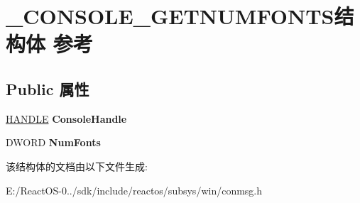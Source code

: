 \hypertarget{struct___c_o_n_s_o_l_e___g_e_t_n_u_m_f_o_n_t_s}{}\section{\+\_\+\+C\+O\+N\+S\+O\+L\+E\+\_\+\+G\+E\+T\+N\+U\+M\+F\+O\+N\+T\+S结构体 参考}
\label{struct___c_o_n_s_o_l_e___g_e_t_n_u_m_f_o_n_t_s}
\subsection*{Public 属性}
\begin{DoxyCompactItemize}
\item 
\mbox{\label{struct___c_o_n_s_o_l_e___g_e_t_n_u_m_f_o_n_t_s_a3b36e69b10470e821c6158c7eed524ec}} 
\hyperlink{interfacevoid}{H\+A\+N\+D\+LE} {\bfseries Console\+Handle}
\item 
\mbox{\label{struct___c_o_n_s_o_l_e___g_e_t_n_u_m_f_o_n_t_s_a30e15edba26e61e01179f7c8be3f605b}} 
D\+W\+O\+RD {\bfseries Num\+Fonts}
\end{DoxyCompactItemize}


该结构体的文档由以下文件生成\+:\begin{DoxyCompactItemize}
\item 
E\+:/\+React\+O\+S-\/0../sdk/include/reactos/subsys/win/conmsg.\+h\end{DoxyCompactItemize}

